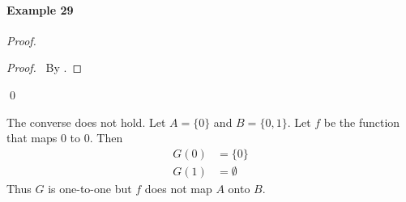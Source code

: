\documentclass{report}
\begin{document}
    \paragraph{Example 29}

    \begin{proof}
        \pf
        \begin{proof}
            \pf\ By .
        \end{proof}
        \qed
    \end{proof}

    The converse does not hold. Let $A = \{0\}$ and $B = \{0,1\}$. Let $f$ be the function that maps 0 to 0.
    Then
    \begin{align*}
        G(0) & = \{ 0 \} \\
        G(1) & = \emptyset
    \end{align*}
    Thus $G$ is one-to-one but $f$ does not map $A$ onto $B$.
\end{document}
